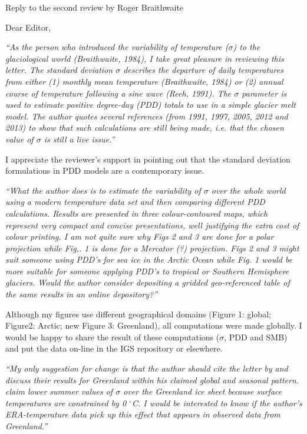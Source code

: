 \documentclass{letter}
\newcommand{\rev}[0]{\color{blue!50!black}\it}
\newcommand{\textrev}[1]{{\rev``#1''}}
\begin{document}
\begin{letter}{Reply to the second review by Roger Braithwaite}

\opening{Dear Editor,}

\textrev{As the person who introduced the variability of temperature ($\sigma$) to the glaciological world (Braithwaite, 1984), I take great pleasure in reviewing this letter. The standard deviation $\sigma$ describes the departure of daily temperatures from either (1) monthly mean temperature (Braithwaite, 1984) or (2) annual course of temperature following a sine wave (Reeh, 1991). The $\sigma$ parameter is used to estimate positive degree-day (PDD) totals to use in a simple glacier melt model. The author quotes several references (from 1991, 1997, 2005, 2012 and 2013) to show that such calculations are still being made, i.e. that the chosen value of $\sigma$ is still a live issue.}

I appreciate the reviewer's support in pointing out that the standard deviation formulations in PDD models are a contemporary issue.

\textrev{What the author does is to estimate the variability of $\sigma$ over the whole world using a modern temperature data set and then comparing different PDD calculations. Results are presented in three colour-contoured maps, which represent very compact and concise presentations, well justifying the extra cost of colour printing. I am not quite sure why Figs 2 and 3 are done for a polar projection while Fig,. 1 is done for a Mercator (?) projection. Figs 2 and 3 might suit someone using PDD’s for sea ice in the Arctic Ocean while Fig. 1 would be more suitable for someone applying PDD’s to tropical or Southern Hemisphere glaciers. Would the author consider depositing a gridded geo-referenced table of the same results in an online depository?}

Although my figures use different geographical domains (Figure 1: global; Figure2: Arctic; new Figure 3: Greenland), all computations were made globally. I would be happy to share the result of these computations ($\sigma$, PDD and SMB) and put the data on-line in the IGS repository or elsewhere.

\textrev{My only suggestion for change is that the author should cite the letter by \citep{fausto-etal-2011} and discuss their results for Greenland within his claimed global and seasonal pattern. \citet{fausto-etal-2011} claim lower summer values of $\sigma$ over the Greenland ice sheet because surface temperatures are constrained by 0 $^\circ$C. I would be interested to know if the author’s ERA-temperature data pick up this effect that appears in observed data from Greenland.}


\end{letter}
\end{document}
